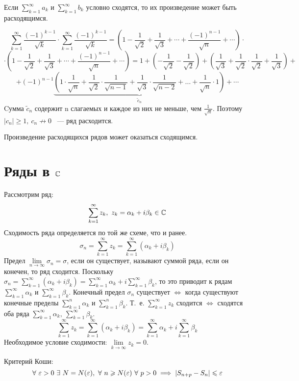 \documentclass[../../main.tex]{subfiles}
\begin{document}
Если $\sum\limits_{k = 1}^{\infty} a_k$ и
$\sum\limits_{k = 1}^{\infty} b_k$ условно сходятся, то их произведение
может быть расходящимся.
\begin{example}
	\[\sum\limits_{k = 1}^{\infty} \frac{(-1)^{k-1}}{\sqrt{k}} \cdot
	\sum\limits_{k = 1}^{\infty} \frac{(-1)^{k-1}}{\sqrt{k}} =
	\left(1 - \frac{1}{\sqrt{2}} + \frac{1}{\sqrt{3}} + \cdots +
	\frac{(-1)^{n-1}}{\sqrt{n}} + \cdots \right) \cdot \]
	\[\cdot \left(1 - \frac{1}{\sqrt{2}} + \frac{1}{\sqrt{3}} + \cdots +
	\frac{(-1)^{n-1}}{\sqrt{n}} + \cdots \right) = 1 +
	\left( - \frac{1}{\sqrt{2}} - \frac{1}{\sqrt{2}} \right) +
	\left( \frac{1}{\sqrt{3}} + \frac{1}{\sqrt{2}} \cdot
	\frac{1}{\sqrt{2}} + \frac{1}{\sqrt{3}} \right) + \] 
	\[ + \left( -1 \right) ^ {n - 1}
	\underbrace{\left(1 \cdot \frac{1}{\sqrt{n}} + \frac{1}{\sqrt{2}} \cdot
	\frac{1}{\sqrt{n - 1}} + \frac{1}{\sqrt{3}} \cdot
	\frac{1}{\sqrt{n - 2}} + \ldots + \frac{1}{\sqrt{n}}
	\cdot 1\right)}_{\tilde{c}_n} + \cdots \]
	Cумма $\tilde{c}_n$ содержит n слагаемых и каждое из них не меньше,
	чем $\frac{1}{\sqrt{n}}$. Поэтому $|c_n| \geq 1, \ c_n \not\to 0$
	~--- ряд расходится.
\end{example}
\begin{remark}
	Произведение расходящихся рядов может оказаться сходящимся.
\end{remark}
\section{Ряды в $\mathbb{C}$}
Рассмотрим ряд:
\[\sum\limits_{k = 1}^{\infty} z_k , \ z_k =
\alpha_k + i\beta_k \in \mathbb{C}\]
Сходимость ряда определяется по той же схеме, что и ранее.
\[ \sigma_n = \sum\limits_{k = 1}^{\infty} z_k =
\sum\limits_{k = 1}^{\infty} (\alpha_k + i\beta_k)\]
Предел $\lim\limits_{n \to \infty} \sigma_n = \sigma$,
если он существует, называют суммой ряда, если он конечен, то ряд сходится.
Поскольку $\sigma_n = \sum\limits_{k = 1}^{\infty} (\alpha_k + i\beta_k) =
\sum\limits_{k = 1}^{\infty} \alpha_k +
i \sum\limits_{k = 1}^{\infty} \beta_k$,
то это приводит к рядам $\sum\limits_{k = 1}^{\infty} \alpha_k$ и
$\sum\limits_{k = 1}^{\infty} \beta_k$.
Конечный предел $\sigma_n$ существует $\iff$ когда
существуют конечные пределы $\sum\limits_{k = 1}^{n} \alpha_k$ и
$\sum\limits_{k = 1}^{n} \beta_k$.
Т.~е. $\sum\limits_{k = 1}^{\infty} z_k$ сходится $\iff$
сходятся оба ряда $\sum\limits_{k = 1}^{\infty} \alpha_k , \
\sum\limits_{k = 1}^{\infty} \beta_k$.
\[\sum\limits_{k = 1}^{\infty} z_k = \sum\limits_{k = 1}^{\infty}
(\alpha_k + i\beta_k) = \sum\limits_{k = 1}^{\infty} \alpha_k +
i\sum\limits_{k = 1}^{\infty} \beta_k\]
Необходимое условие сходимости: $\lim\limits_{k \to \infty} z_k = 0$.

Критерий Коши:
\[ \forall \ \eps > 0 \ \exists \ N = N(\eps), \ \forall \
n \geq N(\eps) \ \forall \ p > 0 \implies
|S_{n + p} - S_n| \leq \eps \]
\end{document}
